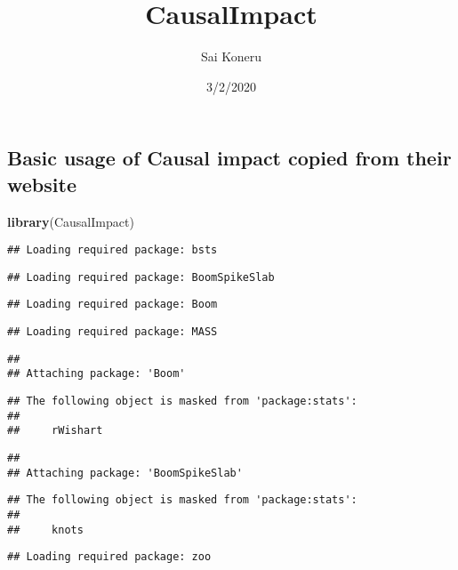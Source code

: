 \documentclass[
]{article}
\title{CausalImpact}
\author{Sai Koneru}
\date{3/2/2020}
\newenvironment{Shaded}{\begin{snugshade}}{\end{snugshade}}
\newcommand{\KeywordTok}[1]{\textcolor[rgb]{0.13,0.29,0.53}{\textbf{#1}}}
\newcommand{\NormalTok}[1]{#1}
\begin{document}
\maketitle

\hypertarget{basic-usage-of-causal-impact-copied-from-their-website}{%
\subsection{Basic usage of Causal impact copied from their
website}\label{basic-usage-of-causal-impact-copied-from-their-website}}

\begin{Shaded}
\begin{Highlighting}[]
\KeywordTok{library}\NormalTok{(CausalImpact)}
\end{Highlighting}
\end{Shaded}

\begin{verbatim}
## Loading required package: bsts
\end{verbatim}

\begin{verbatim}
## Loading required package: BoomSpikeSlab
\end{verbatim}

\begin{verbatim}
## Loading required package: Boom
\end{verbatim}

\begin{verbatim}
## Loading required package: MASS
\end{verbatim}

\begin{verbatim}
## 
## Attaching package: 'Boom'
\end{verbatim}

\begin{verbatim}
## The following object is masked from 'package:stats':
## 
##     rWishart
\end{verbatim}

\begin{verbatim}
## 
## Attaching package: 'BoomSpikeSlab'
\end{verbatim}

\begin{verbatim}
## The following object is masked from 'package:stats':
## 
##     knots
\end{verbatim}

\begin{verbatim}
## Loading required package: zoo
\end{verbatim}
\end{document}
